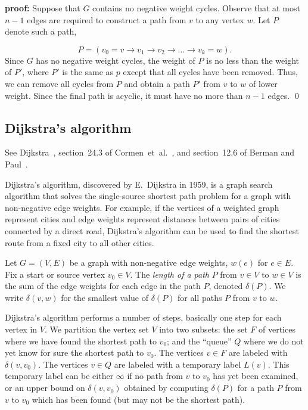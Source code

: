 {\bf proof:}
Suppose that $G$ contains no negative weight cycles. 
Observe that at most $n-1$ edges are required to construct a 
path from $v$ to any vertex $w$. Let $P$ denote such a path,

\[
P = (v_0=v\to v_1 \to v_2 \to \dots \to v_k = w). 
\]
Since $G$ has no negative weight cycles, the weight of $P$ is no less 
than the weight of $P'$, where
$P'$ is the same as $p$ except that all cycles have been removed. 
Thus, we can remove all cycles from $P$ and obtain a path $P'$ 
from $v$ to $w$ of lower weight. Since the
final path is acyclic, it must have no more than $n-1$ edges.
\qed

\subsection{Dijkstra's algorithm}

See Dijkstra~\cite{Dijkstra1959}, section~24.3 of
Cormen~et~al.~\cite{CormenEtAl2001}, and section~12.6 of Berman and
Paul~\cite{BermanPaul1997}.

Dijkstra's algorithm, discovered by E.~Dijkstra in 1959, is a graph
search algorithm that solves the single-source shortest path problem
for a graph with non-negative edge weights. For example, if the
vertices of a weighted graph represent cities and edge weights
represent distances between pairs of cities connected by a direct
road, Dijkstra's algorithm can be used to find the shortest route from
a fixed city to all other cities.


Let $G = (V,E)$ be a graph with non-negative edge weights, $w(e)$ for
$e \in E$. Fix a start or source vertex $v_0 \in V$. The
\emph{length of a path} $P$ from $v \in V$ to $w \in V$ is the sum of
the edge weights for each edge in the path $P$, denoted
$\delta(P)$. We write $\delta(v,w)$ for the smallest value of
$\delta(P)$ for all paths $P$ from $v$ to $w$.

Dijkstra's algorithm performs a number of steps, basically one step
for each vertex in $V$. We partition the vertex set $V$ into two
subsets: the set $F$ of vertices where we have found the shortest path
to $v_0$; and the ``queue'' $Q$ where we do not yet know for sure the
shortest path to $v_0$. The vertices $v \in F$ are labeled with
$\delta(v, v_0)$. The vertices $v \in Q$ are labeled with a temporary
label $L(v)$. This temporary label can be either $\infty$ if no path
from $v$ to $v_0$ has yet been examined, or an upper bound on
$\delta(v, v_0)$ obtained by computing $\delta(P)$ for a path $P$ from
$v$ to $v_0$ which has been found (but may not be the shortest path).

